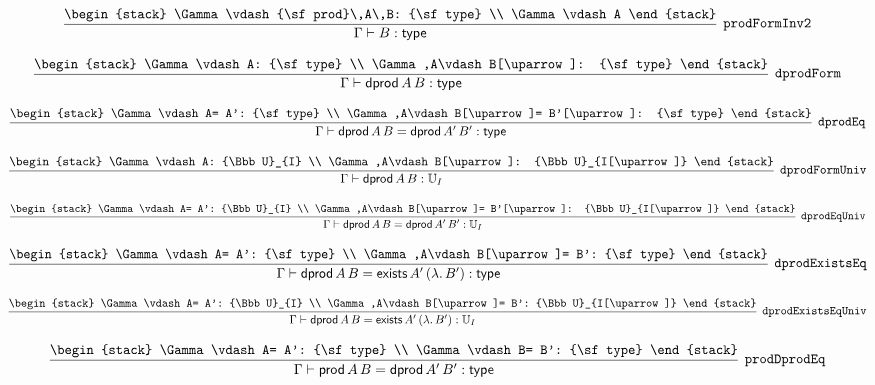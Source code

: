\[
\infer[{\tt prodFormInv2}]{\Gamma \vdash B: {\sf type}}{
\begin{stack}
\Gamma \vdash {\sf prod}\,A\,B: {\sf type}
\\
\Gamma \vdash A
\end{stack}}
\]

\[
\infer[{\tt dprodForm}]{\Gamma \vdash {\sf dprod}\,A\,B: {\sf type}}{
\begin{stack}
\Gamma \vdash A: {\sf type}
\\
\Gamma ,A\vdash B[\uparrow ]: {\sf type}
\end{stack}}
\]

\[
\infer[{\tt dprodEq}]{\Gamma \vdash {\sf dprod}\,A\,B= {\sf dprod}\,A'\,B': {\sf type}}{
\begin{stack}
\Gamma \vdash A= A': {\sf type}
\\
\Gamma ,A\vdash B[\uparrow ]= B'[\uparrow ]: {\sf type}
\end{stack}}
\]

\[
\infer[{\tt dprodFormUniv}]{\Gamma \vdash {\sf dprod}\,A\,B: {\Bbb U}_{I}}{
\begin{stack}
\Gamma \vdash A: {\Bbb U}_{I}
\\
\Gamma ,A\vdash B[\uparrow ]: {\Bbb U}_{I[\uparrow ]}
\end{stack}}
\]

\[
\infer[{\tt dprodEqUniv}]{\Gamma \vdash {\sf dprod}\,A\,B= {\sf dprod}\,A'\,B': {\Bbb U}_{I}}{
\begin{stack}
\Gamma \vdash A= A': {\Bbb U}_{I}
\\
\Gamma ,A\vdash B[\uparrow ]= B'[\uparrow ]: {\Bbb U}_{I[\uparrow ]}
\end{stack}}
\]

\[
\infer[{\tt dprodExistsEq}]{\Gamma \vdash {\sf dprod}\,A\,B= {\sf exists}\,A'\,(\lambda .\,B'): {\sf type}}{
\begin{stack}
\Gamma \vdash A= A': {\sf type}
\\
\Gamma ,A\vdash B[\uparrow ]= B': {\sf type}
\end{stack}}
\]

\[
\infer[{\tt dprodExistsEqUniv}]{\Gamma \vdash {\sf dprod}\,A\,B= {\sf exists}\,A'\,(\lambda .\,B'): {\Bbb U}_{I}}{
\begin{stack}
\Gamma \vdash A= A': {\Bbb U}_{I}
\\
\Gamma ,A\vdash B[\uparrow ]= B': {\Bbb U}_{I[\uparrow ]}
\end{stack}}
\]

\[
\infer[{\tt prodDprodEq}]{\Gamma \vdash {\sf prod}\,A\,B= {\sf dprod}\,A'\,B': {\sf type}}{
\begin{stack}
\Gamma \vdash A= A': {\sf type}
\\
\Gamma \vdash B= B': {\sf type}
\end{stack}}
\]

